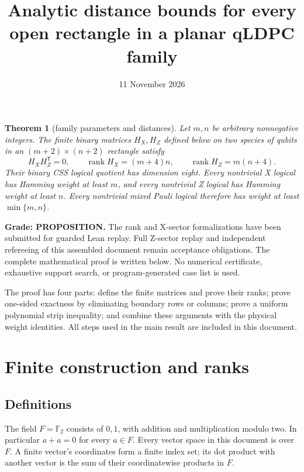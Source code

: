 \documentclass{article}
\title{Analytic distance bounds for every open rectangle in a planar qLDPC family}
\author{}
\date{11 November 2026}
\newtheorem{theorem}{Theorem}
\begin{document}
\maketitle

\begin{theorem}[family parameters and distances]\label{thm:rectangle}
Let \(m,n\) be arbitrary nonnegative integers. The finite binary matrices
\(H_X,H_Z\) defined below on two species of qubits in an
\((m+2)\times(n+2)\) rectangle satisfy
\begin{equation}\label{eq:rect-ranks}
H_XH_Z^{\mathsf T}=0,\qquad
\operatorname{rank}H_X=(m+4)n,\qquad
\operatorname{rank}H_Z=m(n+4).
\end{equation}
Their binary CSS logical quotient has dimension eight. Every nontrivial
X logical has Hamming weight at least \(m\), and every nontrivial Z logical
has Hamming weight at least \(n\). Every nontrivial mixed Pauli logical
therefore has weight at least \(\min\{m,n\}\).
\end{theorem}

\textbf{Grade: PROPOSITION.} The rank and X-sector formalizations have been
submitted for guarded Lean replay. Full Z-sector replay and independent
refereeing of this assembled document remain acceptance obligations.
The complete mathematical proof is written below. No numerical certificate,
exhaustive support search, or program-generated case list is used.

The proof has four parts: define the finite matrices and prove their ranks;
prove one-sided exactness by eliminating boundary rows or columns;
prove a uniform polynomial strip inequality; and combine these arguments
with the physical weight identities. All steps used in the main result
are included in this document.
\section{Finite construction and ranks}
\subsection{Definitions}\label{definitions}

The field \(F=\mathbb F_2\) consists of \(0,1\), with addition and
multiplication modulo two. In particular \(a+a=0\) for every \(a\in F\).
Every vector space in this document is over \(F\). A finite vector's
coordinates form a finite index set; its dot product with another vector
is the sum of their coordinatewise products in \(F\).
\end{document}
